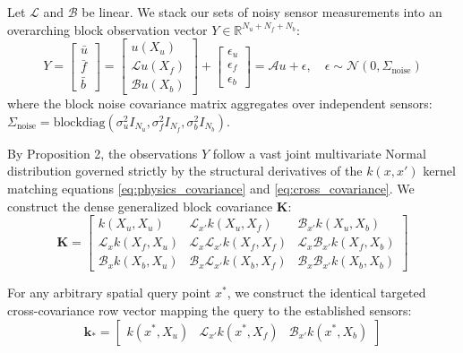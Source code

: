 \documentclass[11pt]{article}
\begin{document}
Let $\mathcal{L}$ and $\mathcal{B}$ be linear. We stack our sets of noisy sensor measurements into an overarching block observation vector $Y \in \mathbb{R}^{N_u + N_f + N_b}$:
\begin{equation}
Y = \begin{bmatrix} \bar u \\ \bar f \\ \bar b \end{bmatrix} = \begin{bmatrix} u(X_u) \\ \mathcal{L}u(X_f) \\ \mathcal{B}u(X_b) \end{bmatrix} + \begin{bmatrix} \epsilon_u \\ \epsilon_f \\ \epsilon_b \end{bmatrix} = \mathcal{A} u + \epsilon, \quad \epsilon \sim \mathcal{N}(0, \Sigma_{\text{noise}})
\end{equation}
where the block noise covariance matrix aggregates over independent sensors: $\Sigma_{\text{noise}} = \text{blockdiag}(\sigma_u^2 I_{N_u}, \sigma_f^2 I_{N_f}, \sigma_b^2 I_{N_b})$.

By Proposition 2, the observations $Y$ follow a vast joint multivariate Normal distribution governed strictly by the structural derivatives of the $k(x, x')$ kernel matching equations \eqref{eq:physics_covariance} and \eqref{eq:cross_covariance}. We construct the dense generalized block covariance $\mathbf{K}$:
\begin{equation}
\mathbf{K} = \begin{bmatrix}
k(X_u, X_u) & \mathcal{L}_{x'}k(X_u, X_f) & \mathcal{B}_{x'}k(X_u, X_b) \\
\mathcal{L}_x k(X_f, X_u) & \mathcal{L}_x \mathcal{L}_{x'} k(X_f, X_f) & \mathcal{L}_x \mathcal{B}_{x'} k(X_f, X_b) \\
\mathcal{B}_x k(X_b, X_u) & \mathcal{B}_x \mathcal{L}_{x'} k(X_b, X_f) & \mathcal{B}_x \mathcal{B}_{x'} k(X_b, X_b)
\end{bmatrix}
\end{equation}

For any arbitrary spatial query point $x^*$, we construct the identical targeted cross-covariance row vector mapping the query to the established sensors:
\begin{equation}
\mathbf{k}_{*} = \begin{bmatrix} k(x^*, X_u) & \mathcal{L}_{x'}k(x^*, X_f) & \mathcal{B}_{x'}k(x^*, X_b) \end{bmatrix}
\end{equation}
\end{document}
